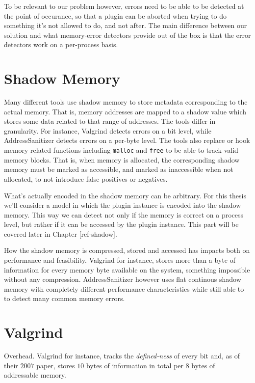 To be relevant to our problem however, errors need to be able to be detected at
the point of occurance, so that a plugin can be aborted when trying to do
something it's not allowed to do, and not after. The main difference between our
solution and what memory-error detectors provide out of the box is that the
error detectors work on a per-process basis.


\section {Shadow Memory}

Many different tools use shadow memory to store metadata corresponding to the
actual memory. That is, memory addresses are mapped to a shadow value which
stores some data related to that range of addresses. The tools differ in
granularity. For instance, Valgrind detects errors on a bit level, while
AddressSanitizer detects errors on a per-byte level. The tools also replace or
hook memory-related functions including \texttt{malloc} and \texttt{free} to be
able to track valid memory blocks. That is, when memory is allocated, the
corresponding shadow memory must be marked as accessible, and marked as
inaccessible when not allocated, to not introduce false positives or negatives.

What's actually encoded in the shadow memory can be arbitrary. For this thesis
we'll consider a model in which the plugin instance is encoded into the shadow
memory. This way we can detect not only if the memory is correct on a process
level, but rather if it can be accessed by the plugin instance. This part will
be covered later in Chapter [ref-shadow].

How the shadow memory is compressed, stored and accessed has impacts both on
performance and feasibility. Valgrind for instance, stores more than a byte of
information for every memory byte available on the system, something impossible
without any compression. AddressSanitizer however uses flat continous shadow
memory with completely different performance characteristics while still able to
to detect many common memory errors.


\section {Valgrind}

Overhead.
Valgrind for instance, tracks the \emph{defined-ness} of every bit and, as of
their $2007$ paper, stores $10$ bytes of information in total per $8$ bytes of
addressable memory.

